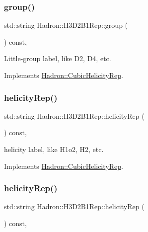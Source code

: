 \subsubsection{\texorpdfstring{group()}{group()}\hspace{0.1cm}{\footnotesize\ttfamily [5/5]}}
{\footnotesize\ttfamily std\+::string Hadron\+::\+H3\+D2\+B1\+Rep\+::group (\begin{DoxyParamCaption}{ }\end{DoxyParamCaption}) const\hspace{0.3cm}{\ttfamily [inline]}, {\ttfamily [virtual]}}

Little-\/group label, like D2, D4, etc. 

Implements \mbox{\hyperlink{structHadron_1_1CubicHelicityRep_a101a7d76cd8ccdad0f272db44b766113}{Hadron\+::\+Cubic\+Helicity\+Rep}}.

\mbox{\label{structHadron_1_1H3D2B1Rep_a3264ff0e5357cfb2c346fa2c8f68cab5}} 
\subsubsection{\texorpdfstring{helicityRep()}{helicityRep()}\hspace{0.1cm}{\footnotesize\ttfamily [1/3]}}
{\footnotesize\ttfamily std\+::string Hadron\+::\+H3\+D2\+B1\+Rep\+::helicity\+Rep (\begin{DoxyParamCaption}{ }\end{DoxyParamCaption}) const\hspace{0.3cm}{\ttfamily [inline]}, {\ttfamily [virtual]}}

helicity label, like H1o2, H2, etc. 

Implements \mbox{\hyperlink{structHadron_1_1CubicHelicityRep_af1096946b7470edf0a55451cc662f231}{Hadron\+::\+Cubic\+Helicity\+Rep}}.

\mbox{\label{structHadron_1_1H3D2B1Rep_a3264ff0e5357cfb2c346fa2c8f68cab5}} 
\subsubsection{\texorpdfstring{helicityRep()}{helicityRep()}\hspace{0.1cm}{\footnotesize\ttfamily [2/3]}}
{\footnotesize\ttfamily std\+::string Hadron\+::\+H3\+D2\+B1\+Rep\+::helicity\+Rep (\begin{DoxyParamCaption}{ }\end{DoxyParamCaption}) const\hspace{0.3cm}{\ttfamily [inline]}, {\ttfamily [virtual]}}

